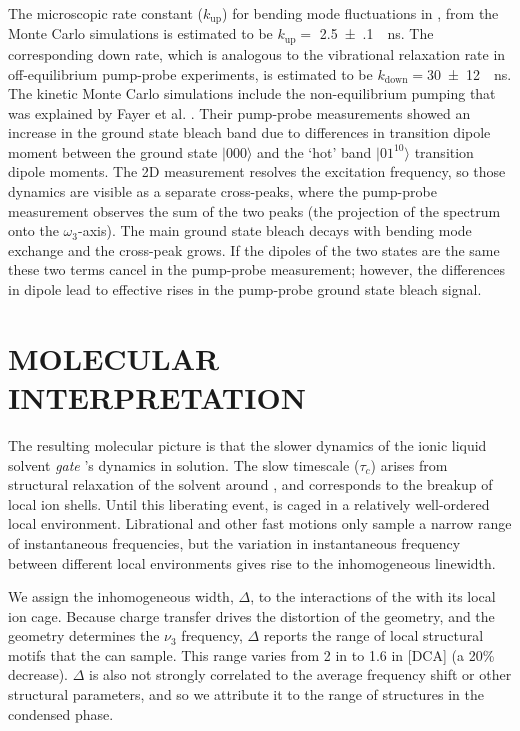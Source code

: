 The microscopic rate constant ($k_{\mathrm{up}}$) for  bending mode fluctuations in \ce{[Im_{4,1}][TfO]}, from the Monte Carlo simulations is estimated to be $k_{\mathrm{up}} =$ \SI[multi-part-units = single]{2.5(1)}{\per\ns}. The corresponding down rate, which is analogous to the vibrational relaxation rate in off-equilibrium pump-probe experiments, is estimated to be $k_{\mathrm{down}} =$\SI[multi-part-units = single]{30(12)}{\per\ns}. The kinetic Monte Carlo simulations include the non-equilibrium pumping that was explained by Fayer et al. \cite{Giammanco2016}. Their pump-probe measurements showed an increase in the ground state bleach band due to differences in transition dipole moment between the ground state $|000\rangle$ and the `hot' band $|01^10\rangle$ transition dipole moments. The 2D measurement resolves the excitation frequency, so those dynamics are visible as a separate cross-peaks, where the pump-probe measurement observes the sum of the two peaks (the projection of the spectrum onto the $\omega_3$-axis). The main ground state bleach decays with bending mode exchange and the cross-peak grows. If the dipoles of the two states are the same these two terms cancel in the pump-probe measurement; however, the differences in dipole lead to effective rises in the pump-probe ground state bleach signal. 

\section{MOLECULAR INTERPRETATION}
\label{sec:anions_interpretation}
The resulting molecular picture is that the slower dynamics of the ionic liquid solvent \textit{gate} 's dynamics in solution. The slow timescale ($\tau_c$) arises from structural relaxation of the solvent around , and corresponds to the breakup of local ion shells. Until this liberating event,  is caged in a relatively well-ordered local environment. Librational and other fast motions only sample a narrow range of instantaneous frequencies, but the variation in instantaneous frequency between different local environments gives rise to the inhomogeneous linewidth.

We assign the inhomogeneous width, $\Delta$, to the interactions of the  with its local ion cage. Because charge transfer drives the distortion of the  geometry, and the geometry determines the $\nu_3$ frequency, $\Delta$ reports the range of local structural motifs that the  can sample.
This range varies from \SI{2}{\wavenumber} in \ce{[PF6]} to \SI{1.6}{\wavenumber} in [DCA]  (a 20\% decrease). $\Delta$ is also not strongly correlated to the average frequency shift or other structural parameters, and so we attribute it to the range of structures in the condensed phase.

